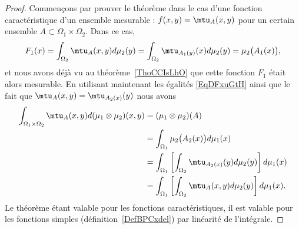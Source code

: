 \begin{proof}
	Commençons par prouver le théorème dans le cas d'une fonction caractéristique d'un ensemble mesurable : \( f(x,y)=\mtu_{A}(x,y)\) pour un certain ensemble \( A\subset \Omega_1\times \Omega_2\). Dans ce cas,
	\begin{equation}
		F_1(x)=\int_{\Omega_2}\mtu_A(x,y)d\mu_2(y)=\int_{\Omega_2}\mtu_{A_1(y)}(x)d\mu_2(y)=\mu_2\big( A_1(x) \big),
	\end{equation}
	et nous avons déjà vu au théorème~\ref{ThoCCIsLhO} que cette fonction \( F_1\) était alors mesurable. En utilisant maintenant les égalités \eqref{EqDFxuGtH} ainsi que le fait que \( \mtu_A(x,y)=\mtu_{A_2(x)}(y)\) nous avons
	\begin{subequations}
		\begin{align}
			\int_{\Omega_1\times \Omega_2}\mtu_A(x,y)d(\mu_1\otimes \mu_2)(x,y) & =(\mu_1\otimes \mu_2)(A)                                                            \\
			                                                                    & =\int_{\Omega_1}\mu_2\big( A_2(x) \big)d\mu_1(x)                                    \\
			                                                                    & =\int_{\Omega_1}\left[   \int_{\Omega_2}\mtu_{A_2(x)}(y)d\mu_2(y)  \right]d\mu_1(x) \\
			                                                                    & =\int_{\Omega_1}\left[ \int_{\Omega_2}\mtu_A(x,y)d\mu_2(y) \right]d\mu_1(x).
		\end{align}
	\end{subequations}
	Le théorème étant valable pour les fonctions caractéristiques, il est valable pour les fonctions simples (définition~\ref{DefBPCxdel}) par linéarité de l'intégrale.


\end{proof}
